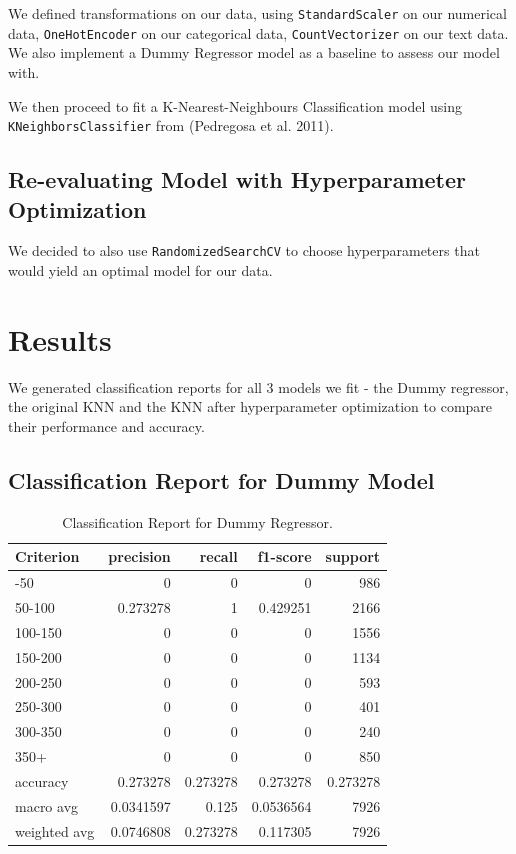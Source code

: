 \documentclass[
  letterpaper,
  DIV=11,
  numbers=noendperiod]{scrartcl}
\begin{document}
We defined transformations on our data, using \texttt{StandardScaler} on
our numerical data, \texttt{OneHotEncoder} on our categorical data,
\texttt{CountVectorizer} on our text data. We also implement a Dummy
Regressor model as a baseline to assess our model with.

We then proceed to fit a K-Nearest-Neighbours Classification model using
\texttt{KNeighborsClassifier} from (Pedregosa et al. 2011).

\subsection{Re-evaluating Model with Hyperparameter
Optimization}\label{re-evaluating-model-with-hyperparameter-optimization}

We decided to also use \texttt{RandomizedSearchCV} to choose
hyperparameters that would yield an optimal model for our data.

\section{Results}\label{results}

We generated classification reports for all 3 models we fit - the Dummy
regressor, the original KNN and the KNN after hyperparameter
optimization to compare their performance and accuracy.

\subsection{Classification Report for Dummy
Model}\label{classification-report-for-dummy-model}

\begin{longtable}[]{@{}lrrrr@{}}

\caption{\label{tbl-dummy-clf}Classification Report for Dummy
Regressor.}

\tabularnewline

\toprule\noalign{}
Criterion & precision & recall & f1-score & support \\
\midrule\noalign{}
\endhead
\bottomrule\noalign{}
\endlastfoot
0-50 & 0 & 0 & 0 & 986 \\
50-100 & 0.273278 & 1 & 0.429251 & 2166 \\
100-150 & 0 & 0 & 0 & 1556 \\
150-200 & 0 & 0 & 0 & 1134 \\
200-250 & 0 & 0 & 0 & 593 \\
250-300 & 0 & 0 & 0 & 401 \\
300-350 & 0 & 0 & 0 & 240 \\
350+ & 0 & 0 & 0 & 850 \\
accuracy & 0.273278 & 0.273278 & 0.273278 & 0.273278 \\
macro avg & 0.0341597 & 0.125 & 0.0536564 & 7926 \\
weighted avg & 0.0746808 & 0.273278 & 0.117305 & 7926 \\

\end{longtable}
\end{document}
